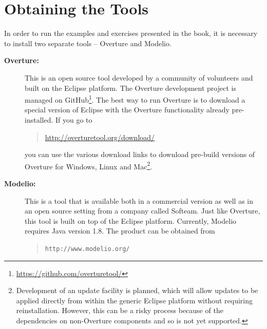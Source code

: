 \section{Obtaining the Tools}\label{sec:install}
In order to run the examples and exercises presented in the book, it is necessary to install two separate tools -- Overture and Modelio.
\begin{description}
\item[\textbf{Overture:}] This is an open source tool developed by a community of volunteers and built on the Eclipse platform. The Overture development project is managed on GitHub\footnote{\url{https://github.com/overturetool/}}.
The best way to run Overture is to download a special version of Eclipse with the Overture functionality already pre-installed. If you go to
  \begin{quote}
  \url{http://overturetool.org/download/}
  \end{quote}
  \noindent you can use the various download links to download pre-build versions of Overture for Windows, Linux and Mac\footnote{Development of an update facility is planned, which will allow updates to be applied directly from within the generic Eclipse platform without requiring reinstallation. However, this can be a risky process because of the dependencies on non-Overture components and so is not yet supported.}.

\item[\textbf{Modelio:}] This is a tool that is available both in a commercial version as well as in an open source setting from a company called Softeam. Just like Overture, this tool is built on top of the Eclipse platform. Currently, Modelio requires Java version 1.8.  The product can be obtained from
\begin{quote}
\texttt{http://www.modelio.org/}
\end{quote}


\end{description}
